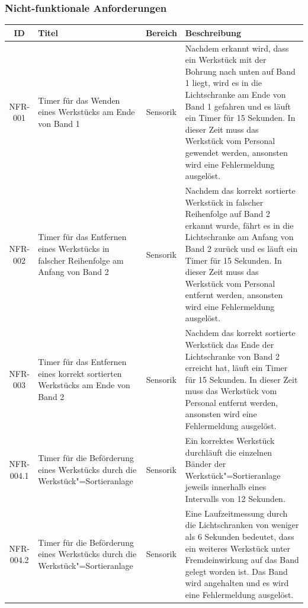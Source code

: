 \documentclass[oneside,a4paper,titlepage]{scrartcl}              %
\begin{document}
\subsubsection{Nicht-funktionale Anforderungen}
\begin{small}
  \begin{center}
    \begin{longtable}{|c|p{4cm}|c|p{7cm}|}
      \hline
      \textbf{ID} & \textbf{Titel} & \textbf{Bereich} & \textbf{Beschreibung}\\
      \toprule
      \endhead
      \hline
      NFR-001 & Timer für das Wenden eines Werkstücks am Ende von Band 1 & Sensorik & Nachdem erkannt wird, dass ein Werkstück mit der Bohrung nach unten auf Band 1 liegt, wird es in die Lichtschranke am Ende von Band 1 gefahren und es läuft ein Timer für 15 Sekunden. In dieser Zeit muss das Werkstück vom Personal gewendet werden, ansonsten wird eine Fehlermeldung ausgelöst.\\
      \hline
      \rowcolor{lightgray} NFR-002 & Timer für das Entfernen eines Werkstücks in falscher Reihenfolge am Anfang von Band 2 & Sensorik & Nachdem das korrekt sortierte Werkstück in falscher Reihenfolge auf Band 2 erkannt wurde, fährt es in die Lichtschranke am Anfang von Band 2 zurück und es läuft ein Timer für 15 Sekunden. In dieser Zeit muss das Werkstück vom Personal entfernt werden, ansonsten wird eine Fehlermeldung ausgelöst.\\
      \hline
      NFR-003 & Timer für das Entfernen eines korrekt sortierten Werkstücks am Ende von Band 2 & Sensorik & Nachdem das korrekt sortierte Werkstück das Ende der Lichtschranke von Band 2 erreicht hat, läuft ein Timer für 15 Sekunden. In dieser Zeit muss das Werkstück vom Personal entfernt werden, ansonsten wird eine Fehlermeldung ausgelöst.\\
      \hline
      \rowcolor{lightgray} NFR-004.1 & Timer für die Beförderung eines Werkstücks durch die Werkstück"=Sortieranlage & Sensorik & Ein korrektes Werkstück durchläuft die einzelnen Bänder der Werkstück"=Sortieranlage jeweils innerhalb eines Intervalls von 12 Sekunden.\\
      \hline
      \rowcolor{lightgray} NFR-004.2 & Timer für die Beförderung eines Werkstücks durch die Werkstück"=Sortieranlage & Sensorik & Eine Laufzeitmessung durch die Lichtschranken von weniger als 6 Sekunden bedeutet, dass ein weiteres Werkstück unter Fremdeinwirkung auf das Band gelegt worden ist. Das Band wird angehalten und es wird eine Fehlermeldung ausgelöst.\\

\end{longtable}
\end{center}
\end{small}
\end{document}
